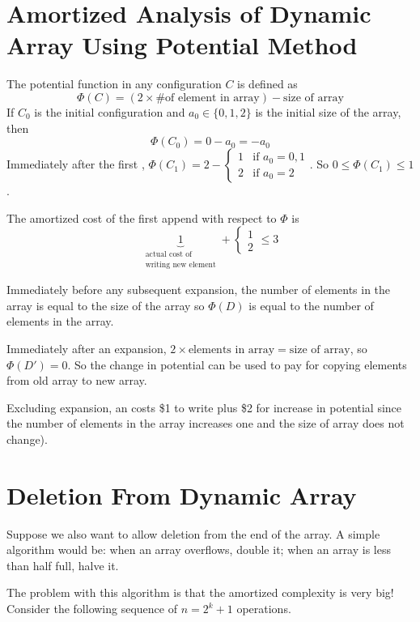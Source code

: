 \section{Amortized Analysis of Dynamic Array Using Potential Method}

The potential function in any configuration $C$ is defined as
$$
\Phi(C) = (2 \times \text{\# of element in array}) - \text{size of array}
$$
If $C_0$ is the initial configuration and $a_0 \in \{0,1,2\}$ is the initial size of the array, then
$$
\Phi(C_0) = 0 - a_0 = -a_0
$$
Immediately after the first , $\Phi(C_1) = 2 - \begin{cases} 1 & \text{if $a_0 = 0,1$} \\ 2 & \text{if $a_0 = 2$} \end{cases}$. So $0 \leq \Phi(C_1) \leq 1$.

The amortized cost of the first append with respect to $\Phi$ is
$$
\underbrace{1}_{\substack{\text{actual cost of} \\ \text{writing new element}}} + \begin{cases} 1 \\ 2 \end{cases} \leq 3
$$

Immediately before any subsequent expansion, the number of elements in the array is equal to the size of the array so $\Phi(D)$ is equal to the number of elements in the array.

Immediately after an expansion, $2 \times \text{elements in array} = \text{size of array}$, so $\Phi(D')=0$. So the change in potential can be used to pay for copying elements from old array to new array.

Excluding expansion, an  costs \$1 to write plus \$2 for increase in potential since the number of elements in the array increases one and the size of array does not change).

\section{Deletion From Dynamic Array}

Suppose we also want to allow deletion from the end of the array. A simple algorithm would be: when an array overflows, double it; when an array is less than half full, halve it.

The problem with this algorithm is that the amortized complexity is very big! Consider the following sequence of $n = 2^k + 1$ operations.

